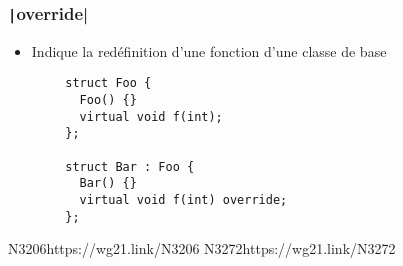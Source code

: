 \documentclass[C++.tex]{subfiles}
\begin{document}
\begin{frame}[fragile]
	\frametitle{\texttt|override|}
	\begin{itemize}
		\item Indique la redéfinition d'une fonction d'une classe de base
	\end{itemize}

	\begin{verbatim}
		struct Foo {
		  Foo() {}
		  virtual void f(int);
		};

		struct Bar : Foo {
		  Bar() {}
		  virtual void f(int) override;
		};
	\end{verbatim}

		{N3206}{https://wg21.link/N3206}
		{N3272}{https://wg21.link/N3272}
\end{frame}
\end{document}
